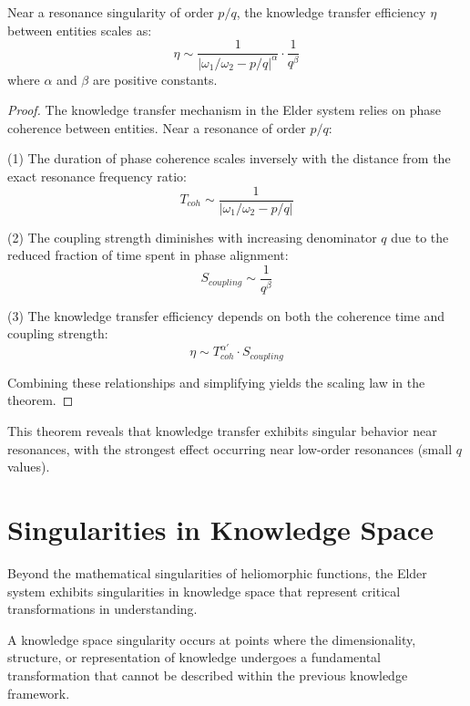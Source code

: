 \begin{theorem}
Near a resonance singularity of order $p/q$, the knowledge transfer efficiency $\eta$ between entities scales as:
\begin{equation}
\eta \sim \frac{1}{|\omega_1/\omega_2 - p/q|^\alpha} \cdot \frac{1}{q^\beta}
\end{equation}
where $\alpha$ and $\beta$ are positive constants.
\end{theorem}

\begin{proof}
The knowledge transfer mechanism in the Elder system relies on phase coherence between entities. Near a resonance of order $p/q$:

(1) The duration of phase coherence scales inversely with the distance from the exact resonance frequency ratio:
\begin{equation}
T_{coh} \sim \frac{1}{|\omega_1/\omega_2 - p/q|}
\end{equation}

(2) The coupling strength diminishes with increasing denominator $q$ due to the reduced fraction of time spent in phase alignment:
\begin{equation}
S_{coupling} \sim \frac{1}{q^{\beta}}
\end{equation}

(3) The knowledge transfer efficiency depends on both the coherence time and coupling strength:
\begin{equation}
\eta \sim T_{coh}^{\alpha'} \cdot S_{coupling}
\end{equation}

Combining these relationships and simplifying yields the scaling law in the theorem.
\end{proof}

This theorem reveals that knowledge transfer exhibits singular behavior near resonances, with the strongest effect occurring near low-order resonances (small $q$ values).

\section{Singularities in Knowledge Space}

Beyond the mathematical singularities of heliomorphic functions, the Elder system exhibits singularities in knowledge space that represent critical transformations in understanding.

\begin{definition}
A knowledge space singularity occurs at points where the dimensionality, structure, or representation of knowledge undergoes a fundamental transformation that cannot be described within the previous knowledge framework.
\end{definition}

